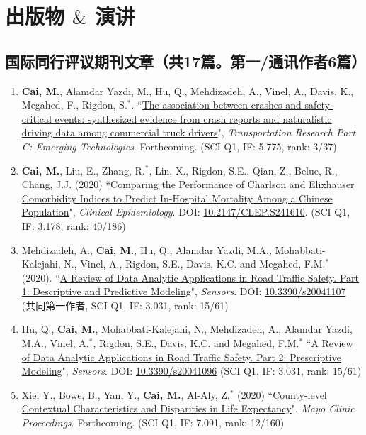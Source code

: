 \documentclass[11pt, a4paper]{article}
\newcommand{\years}[1]{\marginnote{\scriptsize #1}}
\begin{document}
	
	
	
	
	
	\section*{出版物 $\&$ 演讲}
	\subsection*{国际同行评议期刊文章（共17篇。第一/通讯作者6篇）}
	\begin{enumerate}[leftmargin=0ex,itemsep=1ex]
		\item \years{2020}\textcolor{RubineRed}{\textbf{Cai, M.}}, Alamdar Yazdi, M., Hu, Q., Mehdizadeh, A., Vinel, A., Davis, K., Megahed, F., Rigdon, S.$^\ast$. ``\ul{The association between crashes and safety-critical events: synthesized evidence from crash reports and naturalistic driving data among commercial truck drivers}", \emph{Transportation Research Part C: Emerging Technologies}. Forthcoming. (SCI Q1, IF: 5.775, rank: 3/37)
		
		\item \textcolor{RubineRed}{\textbf{Cai, M.}}, Liu, E., Zhang, R.$^\ast$, Lin, X., Rigdon, S.E., Qian, Z., Belue, R., Chang, J.J. (2020) ``\ul{Comparing the Performance of Charlson and Elixhauser Comorbidity Indices to Predict In-Hospital Mortality Among a Chinese Population}", \emph{Clinical Epidemiology}. DOI: \href{https://doi.org/10.2147/CLEP.S241610}{10.2147/CLEP.S241610}. (SCI Q1, IF: 3.178, rank: 40/186)
		
		\item Mehdizadeh, A., \textcolor{RubineRed}{\textbf{Cai, M.}}, Hu, Q., Alamdar Yazdi, M.A., Mohabbati-Kalejahi, N., Vinel, A., Rigdon, S.E., Davis, K.C. and Megahed, F.M.$^\ast$ (2020). ``\ul{A Review of Data Analytic Applications in Road Traffic Safety. Part 1: Descriptive and Predictive Modeling}", \emph{Sensors}. DOI: \href{https://doi.org/10.3390/s20041107}{10.3390/s20041107} (共同第一作者, SCI Q1, IF: 3.031, rank: 15/61)
		
		\item Hu, Q., \textbf{Cai, M.}, Mohabbati-Kalejahi, N., Mehdizadeh, A., Alamdar Yazdi, M.A., Vinel, A.$^\ast$, Rigdon, S.E., Davis, K.C. and Megahed, F.M.$^\ast$ ``\ul{A Review of Data Analytic Applications in Road Traffic Safety. Part 2: Prescriptive Modeling}", \emph{Sensors}. DOI: \href{https://doi.org/10.3390/s20041096}{10.3390/s20041096} (SCI Q1, IF: 3.031, rank: 15/61)
		
		\item Xie, Y., Bowe, B., Yan, Y., \textbf{Cai, M.}, Al-Aly, Z.$^\ast$ (2020) ``\ul{County-level Contextual Characteristics and Disparities in Life Expectancy}", \emph{Mayo Clinic Proceedings}. Forthcoming. (SCI Q1, IF: 7.091, rank: 12/160)
		

\end{enumerate}
\end{document}

